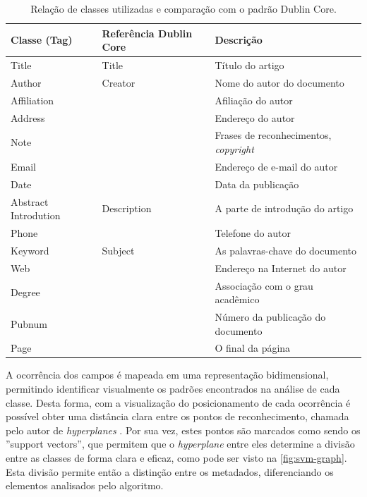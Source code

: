 \begin{table}
    \caption{Relação de classes utilizadas e comparação com o padrão Dublin Core.}
    \begin{center}
        \begin{tabular}{|C{3cm}|C{3cm}|p{7cm}|}
            \hline \textbf{Classe (Tag)} & \textbf{Referência Dublin Core} & \textbf{Descrição}\\ 
            \hline Title & Title & Título do artigo\\
            \hline Author & Creator & Nome do autor do documento\\
            \hline Affiliation & & Afiliação do autor\\
            \hline Address & & Endereço do autor\\
            \hline Note & & Frases de reconhecimentos, \textit{copyright}\\
            \hline Email & & Endereço de e-mail do autor\\
            \hline Date & & Data da publicação\\
            \hline Abstract Introdution & Description & A parte de introdução do artigo\\
            \hline Phone & & Telefone do autor\\
            \hline Keyword & Subject & As palavras-chave do documento\\
            \hline Web & & Endereço na Internet do autor\\
            \hline Degree & & Associação com o grau acadêmico\\
            \hline Pubnum & & Número da publicação do documento\\
            \hline Page & & O final da página\\
            \hline
        \end{tabular}
    \end{center}
    \label{tab:svm-classes}
\end{table}

\begin{textnew}
A ocorrência dos campos é mapeada em uma representação bidimensional, permitindo identificar visualmente os padrões encontrados na análise de cada classe. Desta forma, com a visualização do posicionamento de cada ocorrência é possível obter uma distância clara entre os pontos de reconhecimento, chamada pelo autor de \textit{hyperplanes} \cite{Vapnik-SVM}. Por sua vez, estes pontos são marcados como sendo os ''support vectors'', que permitem que o \textit{hyperplane} entre eles determine a divisão entre as classes de forma clara e eficaz, como pode ser visto na \autoref{fig:svm-graph}. Esta divisão permite então a distinção entre os metadados, diferenciando os elementos analisados pelo algoritmo.
\end{textnew}

